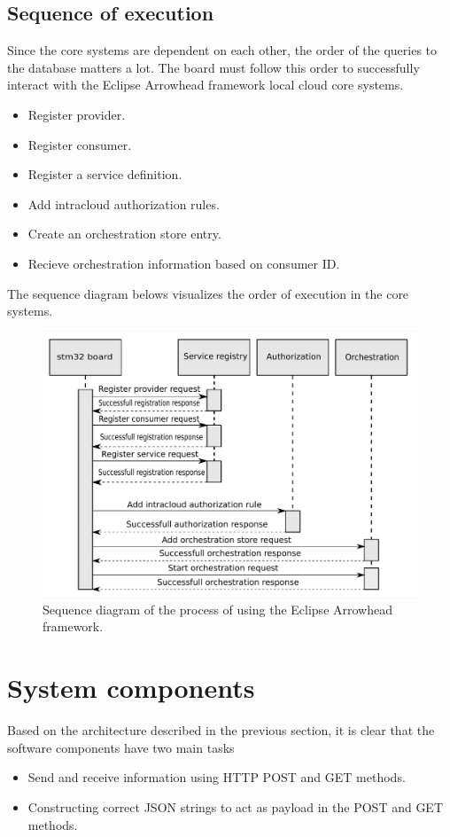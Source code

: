 \subsection{Sequence of execution}
Since the core systems are dependent on each other, the order of the queries to the database matters a lot.
The board must follow this order to successfully interact with the Eclipse Arrowhead framework local cloud core systems. 
\begin{itemize}
    \item Register provider.
    \item Register consumer.
    \item Register a service definition.
    \item Add intracloud authorization rules.
    \item Create an orchestration store entry.
    \item Recieve orchestration information based on consumer ID.
\end{itemize}
\newpage
The sequence diagram belows visualizes the order of execution in the core systems.
\begin{figure}[H]
    \centering
    \includegraphics[width=\textwidth]{Pictures/sequence_diagram_total.pdf} 
    \caption{Sequence diagram of the process of using the Eclipse Arrowhead framework.}
    \label{sequence diagram whole process}
\end{figure}

\section{System components}
Based on the architecture described in the previous section, it is clear that the software components have two main tasks
\begin{itemize}
    \item Send and receive information using HTTP POST and GET methods.
    \item Constructing correct JSON strings to act as payload in the POST and GET methods. 
\end{itemize}
